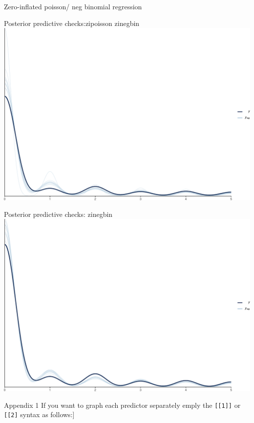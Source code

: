 \documentclass[
  ignorenonframetext,
]{beamer}
\begin{document}
\begin{frame}[fragile]{Zero-inflated poisson/ neg binomial regression}
\begin{block}{Posterior predictive checks:zipoisson zinegbin}
\protect\hypertarget{posterior-predictive-checkszipoisson-zinegbin}{}
\includegraphics{slides_files/figure-beamer/unnamed-chunk-69-1.pdf}
\end{block}

\begin{block}{Posterior predictive checks: zinegbin}
\protect\hypertarget{posterior-predictive-checks-zinegbin}{}
\includegraphics{slides_files/figure-beamer/unnamed-chunk-70-1.pdf}
\end{block}

\begin{block}{Appendix 1}
\protect\hypertarget{appendix-1}{}
If you want to graph each predictor separately emply the
\texttt{{[}{[}1{]}{]}} or \texttt{{[}{[}2{]}} syntax as follows:{]}


\end{block}
\end{frame}
\end{document}
